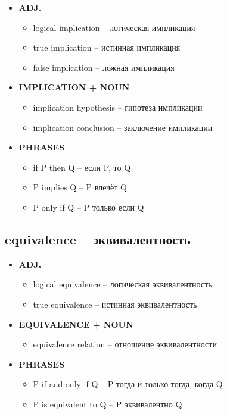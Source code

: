\documentclass[a4paper, 10pt]{article}
\theoremstyle{definition}
\theoremstyle{plain}
\theoremstyle{remark}
\begin{document}
\begin{itemize}
    \item \textbf{ADJ.}
    \begin{itemize}
        \item logical implication – логическая импликация
        \item true implication – истинная импликация
        \item false implication – ложная импликация
    \end{itemize}
    
    \item \textbf{IMPLICATION + NOUN}
    \begin{itemize}
        \item implication hypothesis – гипотеза импликации
        \item implication conclusion – заключение импликации
    \end{itemize}
    
    \item \textbf{PHRASES}
    \begin{itemize}
        \item if P then Q – если P, то Q
        \item P implies Q – P влечёт Q
        \item P only if Q – P только если Q
    \end{itemize}
\end{itemize}

\subsection{equivalence – эквивалентность}

\begin{itemize}
    \item \textbf{ADJ.}
    \begin{itemize}
        \item logical equivalence – логическая эквивалентность
        \item true equivalence – истинная эквивалентность
    \end{itemize}
    
    \item \textbf{EQUIVALENCE + NOUN}
    \begin{itemize}
        \item equivalence relation – отношение эквивалентности
    \end{itemize}
    
    \item \textbf{PHRASES}
    \begin{itemize}
        \item P if and only if Q – P тогда и только тогда, когда Q
        \item P is equivalent to Q – P эквивалентно Q
    \end{itemize}
\end{itemize}
\end{document}

